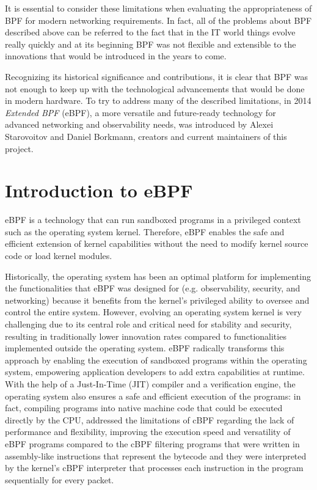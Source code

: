It is essential to consider these limitations when evaluating the appropriateness of  BPF for modern networking requirements. 
In fact, all of the problems about BPF described above can be referred to the fact that in the IT world things evolve really quickly and at its beginning BPF was not flexible and extensible to the innovations that would be introduced in the years to come.

Recognizing its historical significance and contributions, it is clear that BPF was not enough to keep up with the technological advancements that would be done in modern hardware.
To try to address many of the described limitations, in 2014 \textit{Extended BPF} (eBPF), a more versatile and future-ready technology for advanced networking and observability needs, was introduced by Alexei Starovoitov and Daniel Borkmann, creators and current maintainers of this project.

\section{Introduction to eBPF}

eBPF is a technology that can run sandboxed programs in a privileged context such as the operating system kernel.
Therefore, eBPF enables the safe and efficient extension of kernel capabilities without the need to modify kernel source code or load kernel modules.

Historically, the operating system has been an optimal platform for implementing the functionalities that eBPF was designed for (e.g. observability, security, and networking) because it benefits from the kernel's privileged ability to oversee and control the entire system.
However, evolving an operating system kernel is very challenging due to its central role and critical need for stability and security, resulting in traditionally lower innovation rates compared to functionalities implemented outside the operating system.
eBPF radically transforms this approach by enabling the execution of sandboxed programs within the operating system, empowering application developers to add extra capabilities at runtime. 
With the help of a Just-In-Time (JIT) compiler and a verification engine, the operating system also ensures a safe and efficient execution of the programs: in fact, compiling programs into native machine code that could be executed directly by the CPU, addressed the limitations of cBPF regarding the lack of performance and flexibility, improving the execution speed and versatility of eBPF programs compared to the cBPF filtering programs that were written in assembly-like instructions that 
represent the bytecode and they were interpreted by the kernel's cBPF interpreter that processes each instruction in the program sequentially for every packet.

